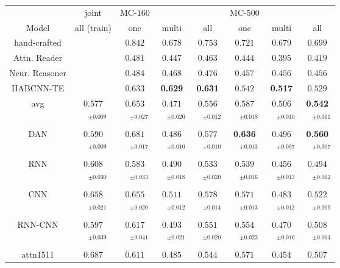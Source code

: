 \documentclass[11pt]{article}
\begin{document}
\begin{figure*}[t]
\centering
\setlength{\tabcolsep}{3pt}
\begin{tabular}{|c|c|ccc|ccc|}
\hline
& joint & MC-160     &             &            & MC-500     &      & \\
Model       & all (train)        & one & multi & all & one & multi & all \\
\hline
\hline
hand-crafted &  & $0.842$ & $0.678$ & $0.753$ & $0.721$ & $0.679$ & $0.699$\\
\hline
\hline
Attn. Reader & & $0.481$ & $0.447$ & $0.463$ & $0.444$ & $0.395$ & $0.419$ \\
Neur. Reasoner & & $0.484$ & $0.468$ & $0.476$ & $0.457$ & $0.456$ & $0.456$ \\
HABCNN-TE & & $0.633$ & \textbf{0.629} & \textbf{0.631} & $0.542$ & \textbf{0.517} & $0.529$ \\
\hline
\hline
avg & $0.577$ & $0.653$ & $0.471$ & $0.556$ & $0.587$ & $0.506$ & \textbf{0.542}\\
 & $\quad^{\pm0.009}$ & $\quad^{\pm0.027}$ & $\quad^{\pm0.020}$ & $\quad^{\pm0.012}$ & $\quad^{\pm0.018}$ & $\quad^{\pm0.010}$ & $\quad^{\pm0.011}$\\
DAN & $0.590$ & $0.681$ & $0.486$ & $0.577$ & \textbf{0.636} & $0.496$ & \textbf{0.560}\\
 & $\quad^{\pm0.009}$ & $\quad^{\pm0.017}$ & $\quad^{\pm0.010}$ & $\quad^{\pm0.010}$ & $\quad^{\pm0.013}$ & $\quad^{\pm0.007}$ & $\quad^{\pm0.007}$\\
\hline
RNN & $0.608$ & $0.583$ & $0.490$ & $0.533$ & $0.539$ & $0.456$ & $0.494$\\
 & $\quad^{\pm0.030}$ & $\quad^{\pm0.033}$ & $\quad^{\pm0.018}$ & $\quad^{\pm0.020}$ & $\quad^{\pm0.016}$ & $\quad^{\pm0.013}$ & $\quad^{\pm0.012}$\\
CNN & $0.658$ & $0.655$ & $0.511$ & $0.578$ & $0.571$ & $0.483$ & $0.522$\\
 & $\quad^{\pm0.021}$ & $\quad^{\pm0.020}$ & $\quad^{\pm0.012}$ & $\quad^{\pm0.014}$ & $\quad^{\pm0.013}$ & $\quad^{\pm0.012}$ & $\quad^{\pm0.009}$\\
RNN-CNN & $0.597$ & $0.617$ & $0.493$ & $0.551$ & $0.554$ & $0.470$ & $0.508$\\
 & $\quad^{\pm0.039}$ & $\quad^{\pm0.041}$ & $\quad^{\pm0.021}$ & $\quad^{\pm0.020}$ & $\quad^{\pm0.023}$ & $\quad^{\pm0.016}$ & $\quad^{\pm0.014}$\\
attn1511 & $0.687$ & $0.611$ & $0.485$ & $0.544$ & $0.571$ & $0.454$ & $0.507$\\

\end{tabular}
\end{figure*}
\end{document}
